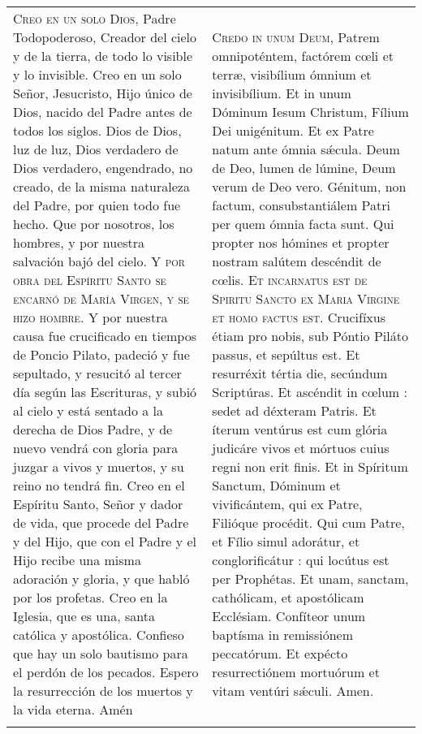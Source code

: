 \documentclass[./00_main.tex]{subfiles}
\begin{document}
\begin{longtable} { p{} p{} }
    \label{creed-nicene}
    \textsc{Creo en un solo Dios}, Padre Todopoderoso, Creador del cielo y de la tierra, de todo lo visible y lo invisible. 
    Creo en un solo Señor, Jesucristo, Hijo único de Dios, nacido del Padre antes de todos los siglos. Dios de Dios, luz de luz, 
    Dios verdadero de Dios verdadero, engendrado, no creado, de la misma naturaleza del Padre, por quien todo fue hecho. Que por nosotros, los hombres, 
    y por nuestra salvación bajó del cielo. \textsc{Y por obra del Espíritu Santo se encarnó de María Virgen, y se hizo hombre}. 
    Y por nuestra causa fue crucificado en tiempos de Poncio Pilato, padeció y fue sepultado, y resucitó al tercer día según las Escrituras, 
    y subió al cielo y está sentado a la derecha de Dios Padre, y de nuevo vendrá con gloria para juzgar a vivos y muertos, y su reino no tendrá fin. 
    Creo en el Espíritu Santo, Señor y dador de vida, que procede del Padre y del Hijo, que con el Padre y el Hijo recibe una misma adoración y gloria, 
    y que habló por los profetas. Creo en la Iglesia, que es una, santa católica y apostólica. Confieso que hay un solo bautismo para el perdón de los pecados. 
    Espero la resurrección de los muertos y la vida eterna. Amén
        &
    \textsc{Credo in unum Deum}, Patrem omnipoténtem, factórem c{\oe}li et terr{\ae}, visibílium ómnium et invisibílium.
    Et in unum Dóminum Iesum Christum, Fílium Dei unigénitum. Et ex Patre natum ante ómnia s{\'\ae}cula. Deum de Deo, lumen de lúmine, Deum verum de Deo vero.
    Génitum, non factum, consubstantiálem Patri per quem ómnia facta sunt. Qui propter nos hómines et propter nostram salútem descéndit de c{\oe}lis.
    \textsc{Et incarnatus est de Spiritu Sancto ex Maria Virgine et homo factus est}. Crucifíxus étiam pro nobis, sub Póntio Piláto passus, et sepúltus est.
    Et resurréxit tértia die, secúndum Scriptúras. Et ascéndit in c{\oe}lum : sedet ad déxteram Patris. Et íterum ventúrus est cum glória judicáre vivos et mórtuos cuius regni non erit finis.
    Et in Spíritum Sanctum, Dóminum et vivificántem, qui ex Patre, Filióque procédit. Qui cum Patre, et Fílio simul adorátur, et conglorificátur : qui locútus est per Prophétas.
    Et unam, sanctam, cathólicam, et apostólicam Ecclésiam. Confíteor unum baptísma in remissiónem peccatórum. Et expécto resurrectiónem mortuórum et vitam ventúri s{\'\ae}culi. Amen.\\\\
\end{longtable}
\end{document}
